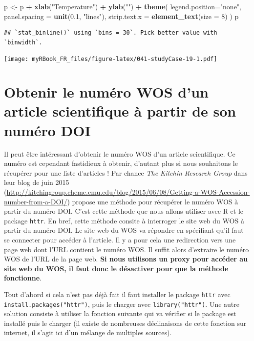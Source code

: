\documentclass[]{book}
\newenvironment{Shaded}{\begin{snugshade}}{\end{snugshade}}
\newcommand{\DataTypeTok}[1]{\textcolor[rgb]{0.13,0.29,0.53}{#1}}
\newcommand{\DecValTok}[1]{\textcolor[rgb]{0.00,0.00,0.81}{#1}}
\newcommand{\FloatTok}[1]{\textcolor[rgb]{0.00,0.00,0.81}{#1}}
\newcommand{\KeywordTok}[1]{\textcolor[rgb]{0.13,0.29,0.53}{\textbf{#1}}}
\newcommand{\NormalTok}[1]{#1}
\newcommand{\OperatorTok}[1]{\textcolor[rgb]{0.81,0.36,0.00}{\textbf{#1}}}
\newcommand{\StringTok}[1]{\textcolor[rgb]{0.31,0.60,0.02}{#1}}
\begin{document}
\begin{Shaded}
\begin{Highlighting}[]
\NormalTok{p <-}\StringTok{ }\NormalTok{p }\OperatorTok{+}\StringTok{ }\KeywordTok{xlab}\NormalTok{(}\StringTok{"Temperature"}\NormalTok{) }\OperatorTok{+}\StringTok{ }\KeywordTok{ylab}\NormalTok{(}\StringTok{""}\NormalTok{) }\OperatorTok{+}
\StringTok{    }\KeywordTok{theme}\NormalTok{(}
      \DataTypeTok{legend.position=}\StringTok{"none"}\NormalTok{,}
      \DataTypeTok{panel.spacing =} \KeywordTok{unit}\NormalTok{(}\FloatTok{0.1}\NormalTok{, }\StringTok{"lines"}\NormalTok{),}
      \DataTypeTok{strip.text.x =} \KeywordTok{element_text}\NormalTok{(}\DataTypeTok{size =} \DecValTok{8}\NormalTok{)}
\NormalTok{    ) }
\NormalTok{p}
\end{Highlighting}
\end{Shaded}

\begin{verbatim}
## `stat_binline()` using `bins = 30`. Pick better value with `binwidth`.
\end{verbatim}

\texttt{[image: myRBook\_FR\_files/figure-latex/041-studyCase-19-1.pdf]}

\hypertarget{studyCase002}{%
\chapter{Obtenir le numéro WOS d'un article scientifique à partir de son numéro DOI}\label{studyCase002}}

Il peut être intéressant d'obtenir le numéro WOS d'un article scientifique. Ce numéro est cependant fastidieux à obtenir, d'autant plus si nous souhaitons le récupérer pour une liste d'articles ! Par chance \emph{The Kitchin Research Group} dans leur blog de juin 2015 (\url{http://kitchingroup.cheme.cmu.edu/blog/2015/06/08/Getting-a-WOS-Accession-number-from-a-DOI/}) propose une méthode pour récupérer le numéro WOS à partir du numéro DOI. C'est cette méthode que nous allons utiliser avec R et le package \texttt{httr}. En bref, cette méthode consite à interroger le site web du WOS à partir du numéro DOI. Le site web du WOS va répondre en spécifiant qu'il faut se connecter pour accéder à l'article. Il y a pour cela une redirection vers une page web dont l'URL contient le numéro WOS. Il suffit alors d'extraire le numéro WOS de l'URL de la page web. \textbf{Si nous utilisons un proxy pour accéder au site web du WOS, il faut donc le désactiver pour que la méthode fonctionne}.

Tout d'abord si cela n'est pas déjà fait il faut installer le package \texttt{httr} avec \texttt{install.packages("httr")}, puis le charger avec \texttt{library("httr")}. Une autre solution consiste à utiliser la fonction suivante qui va vérifier si le package est installé puis le charger (il existe de nombreuses déclinaisons de cette fonction sur internet, il s'agit ici d'un mélange de multiples sources).
\end{document}
